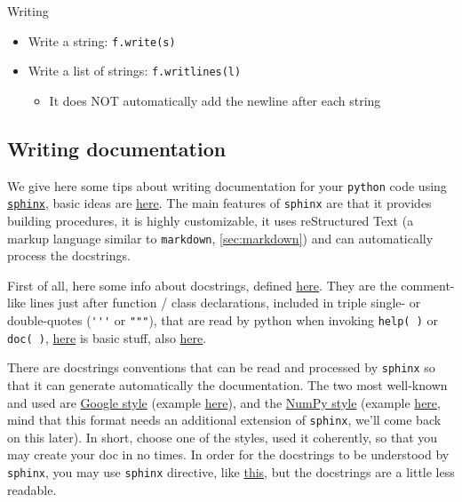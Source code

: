 \documentclass[a4paper,12pt,%
              final%
              ]{article}
\begin{document}
Writing
\begin{itemize}
  \item Write a string: \verb|f.write(s)|
  \item Write a list of strings: \verb|f.writlines(l)|
    \begin{itemize}
      \item It does NOT automatically add the newline after each string
    \end{itemize}
\end{itemize}

\subsection{Writing documentation}
We give here some tips about writing documentation for your \texttt{python} code using \href{https://www.sphinx-doc.org/en/master/index.html}{\texttt{sphinx}}, basic ideas are \href{https://docs.python-guide.org/writing/documentation/}{here}. The main features of \texttt{sphinx} are that it provides building procedures, it is highly customizable, it uses reStructured Text (a markup language similar to \texttt{markdown}, \autoref{sec:markdown}) and can automatically process the docstrings.

First of all, here some info about docstrings, defined \href{https://www.python.org/dev/peps/pep-0257/}{here}. They are the comment-like lines just after function / class declarations, included in triple single- or double-quotes (\verb|'''| or \verb|"""|), that are read by python when invoking \texttt{help( )} or \texttt{doc( )}, \href{https://www.geeksforgeeks.org/python-docstrings/}{here} is basic stuff, also \href{https://www.programiz.com/python-programming/docstrings}{here}.

There are docstrings conventions that can be read and processed by \texttt{sphinx} so that it can generate automatically the documentation. The two most well-known and used are \href{https://www.programiz.com/python-programming/docstrings}{Google style} (example \href{https://sphinxcontrib-napoleon.readthedocs.io/en/latest/example_google.html}{here}), and the \href{https://numpydoc.readthedocs.io/en/latest/format.html}{NumPy style} (example \href{https://sphinxcontrib-napoleon.readthedocs.io/en/latest/example_numpy.html#example-numpy}{here}, mind that this format needs an additional extension of \texttt{sphinx}, we'll come back on this later). In short, choose one of the styles, used it coherently, so that you may create your doc in no times. In order for the docstrings to be understood by \texttt{sphinx}, you may use \texttt{sphinx} directive, like \href{https://sphinx-rtd-tutorial.readthedocs.io/en/latest/docstrings.html#an-example-class-with-docstrings}{this}, but the docstrings are a little less readable.
\end{document}
